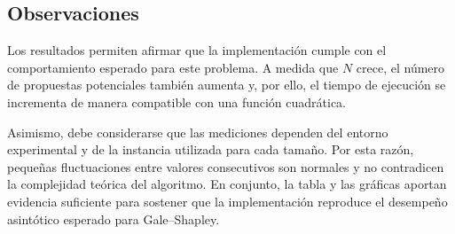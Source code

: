 \subsection{Observaciones}

Los resultados permiten afirmar que la implementación cumple con el comportamiento esperado para este problema. A medida que $N$ crece, el número de propuestas potenciales también aumenta y, por ello, el tiempo de ejecución se incrementa de manera compatible con una función cuadrática.

Asimismo, debe considerarse que las mediciones dependen del entorno experimental y de la instancia utilizada para cada tamaño. Por esta razón, pequeñas fluctuaciones entre valores consecutivos son normales y no contradicen la complejidad teórica del algoritmo. En conjunto, la tabla y las gráficas aportan evidencia suficiente para sostener que la implementación reproduce el desempeño asintótico esperado para Gale--Shapley.
